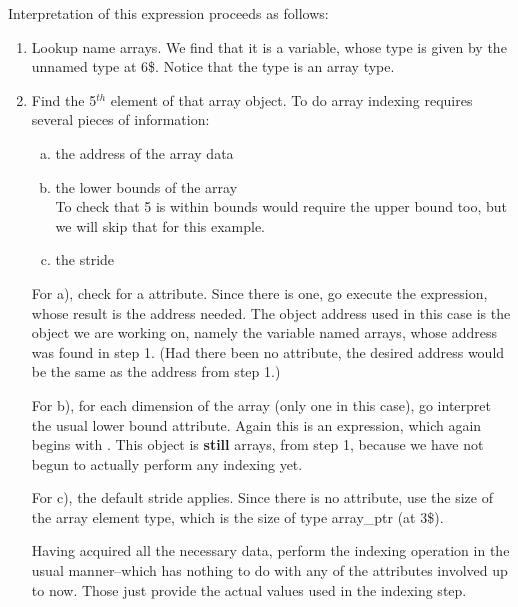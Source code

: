 Interpretation of this expression proceeds as follows:
\begin{enumerate}[1. ]

\item Lookup name arrays. We find that it is a variable,
whose type is given by the unnamed type at 6\$. Notice that
the type is an array type.


\item Find the 5$^{th}$ element of that array object. To do array
indexing requires several pieces of information:
\begin{enumerate}[a) ]

\item  the address of the array data

\item the lower bounds of the array \\
\lbrack To check that 5 is within bounds would require the upper
bound too, but we will skip that for this example. \rbrack

\item the stride 

\end{enumerate}

For a), check for a  attribute. Since
there is one, go execute the expression, whose result is
the address needed. The object address used in this case
is the object we are working on, namely the variable named
arrays, whose address was found in step 1. (Had there been
no  attribute, the desired address would
be the same as the address from step 1.)

For b), for each dimension of the array (only one
in this case), go interpret the usual lower bound
attribute. Again this is an expression, which again begins
with . This object is 
\textbf{still} arrays,
from step 1, because we have not begun to actually perform
any indexing yet.

For c), the default stride applies. Since there is no
 attribute, use the size of the array element
type, which is the size of type array\_ptr (at 3\$).

\clearpage

Having acquired all the necessary data, perform the indexing
operation in the usual manner--which has nothing to do with
any of the attributes involved up to now. Those just provide
the actual values used in the indexing step.


\end{enumerate}
